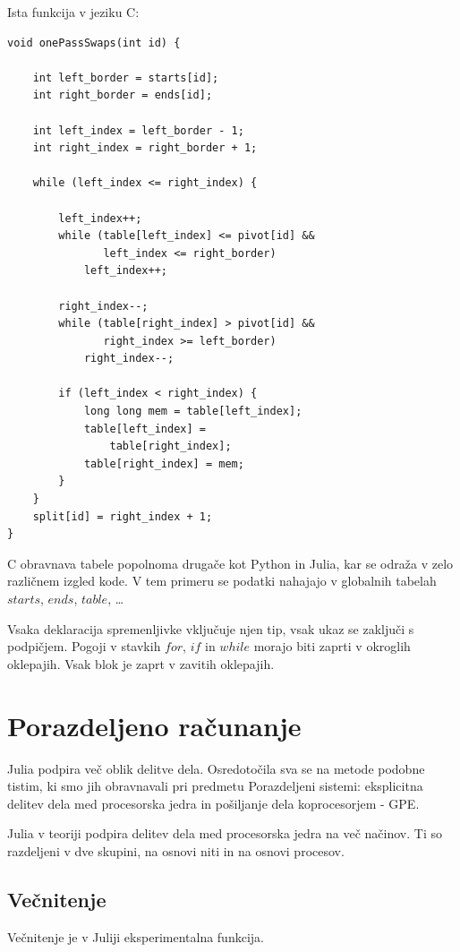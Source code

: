 \documentclass[journal,a4paper,twoside]{sty/IEEEtran}
\begin{document}
Ista funkcija v jeziku C:
\begin{lstlisting}
void onePassSwaps(int id) {

    int left_border = starts[id];
    int right_border = ends[id];

    int left_index = left_border - 1;
    int right_index = right_border + 1;

    while (left_index <= right_index) {

        left_index++;
        while (table[left_index] <= pivot[id] &&
               left_index <= right_border)
            left_index++;

        right_index--;
        while (table[right_index] > pivot[id] &&
               right_index >= left_border)
            right_index--;

        if (left_index < right_index) {
            long long mem = table[left_index];
            table[left_index] =
                table[right_index];
            table[right_index] = mem;
        }
    }
    split[id] = right_index + 1;
}
\end{lstlisting}

C obravnava tabele popolnoma drugače kot Python in Julia, kar se odraža v zelo različnem izgled kode.
V tem primeru se podatki nahajajo v globalnih tabelah $starts$, $ends$, $table$, \ldots

Vsaka deklaracija spremenljivke vključuje njen tip, vsak ukaz se zaključi s podpičjem.
Pogoji v stavkih $for$, $if$ in $while$ morajo biti zaprti v okroglih oklepajih.
Vsak blok je zaprt v zavitih oklepajih.

\section{Porazdeljeno računanje}

Julia podpira več oblik delitve dela.
Osredotočila sva se na metode podobne tistim, ki smo jih obravnavali pri predmetu Porazdeljeni sistemi: eksplicitna delitev dela med procesorska jedra in
	pošiljanje dela koprocesorjem - GPE.

Julia v teoriji podpira delitev dela med procesorska jedra na več načinov.
Ti so razdeljeni v dve skupini, na osnovi niti in na osnovi procesov.

\subsection{Večnitenje}

Večnitenje je v Juliji eksperimentalna funkcija.
\end{document}

